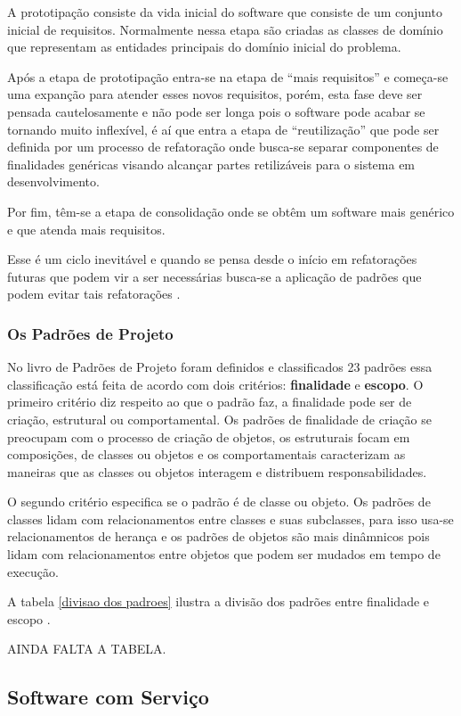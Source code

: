 A prototipação consiste da vida inicial do software que consiste de um conjunto inicial de requisitos. Normalmente nessa etapa são criadas as classes de domínio que representam as entidades principais do domínio inicial do problema.

Após a etapa de prototipação entra-se na etapa de ``mais requisitos'' e começa-se uma expanção para atender esses novos requisitos, porém, esta fase deve ser pensada cautelosamente e não pode ser longa pois o software pode acabar se tornando muito inflexível, é aí que entra a etapa de ``reutilização'' que pode ser definida por um processo de refatoração onde busca-se separar componentes de finalidades genéricas visando alcançar partes retilizáveis para o sistema em desenvolvimento.

Por fim, têm-se a etapa de consolidação onde se obtêm um software mais genérico e que atenda mais requisitos.

Esse é um ciclo inevitável e quando se pensa desde o início em refatorações futuras que podem vir a ser necessárias busca-se a aplicação de padrões que podem evitar tais refatorações \cite{Gamma:Helm:Johnson:Vlissides:1995}.

\subsubsection{Os Padrões de Projeto}

No livro de Padrões de Projeto foram definidos e classificados 23 padrões essa classificação está feita de acordo com dois critérios: \textbf{finalidade} e \textbf{escopo}. O primeiro critério diz respeito ao que o padrão faz, a finalidade pode ser de criação, estrutural ou comportamental. Os padrões de finalidade de criação se preocupam com o processo de criação de objetos, os estruturais focam em composições, de classes ou objetos e os comportamentais caracterizam as maneiras que as classes ou objetos interagem e distribuem responsabilidades.

O segundo critério especifica se o padrão é de classe ou objeto. Os padrões de classes lidam com relacionamentos entre classes e suas subclasses, para isso usa-se relacionamentos de herança e os padrões de objetos são mais dinâmnicos pois lidam com relacionamentos entre objetos que podem ser mudados em tempo de execução.

A tabela \ref{divisao dos padroes} ilustra a divisão dos padrões entre finalidade e escopo \cite{Gamma:Helm:Johnson:Vlissides:1995}.

AINDA FALTA A TABELA.

\subsection{Software com Serviço}
